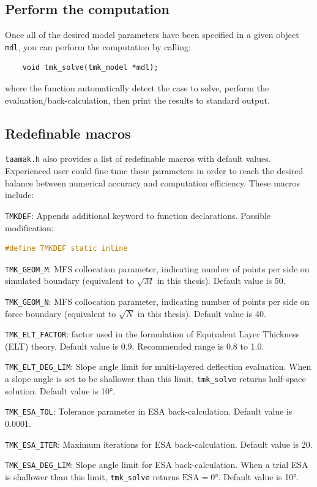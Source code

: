 \documentclass{article}
\begin{document}
\subsection{Perform the computation}
Once all of the desired model parameters have been specified in a given object \texttt{mdl}, you can perform the computation by calling:
\begin{lstlisting}
    void tmk_solve(tmk_model *mdl);
\end{lstlisting}
where the function automatically detect the case to solve, perform the evaluation/back-calculation, then print the results to standard output.

\subsection{Redefinable macros}
\texttt{taamak.h} also provides a list of redefinable macros with default values. Experienced user could fine tune these parameters in order to reach the desired balance between numerical accuracy and computation efficiency. These macros include:
\par 
\medskip
\texttt{TMKDEF}: Appends additional keyword to function declarations. Possible modification: 
\begin{file}[demo.c]
\begin{lstlisting}[language=C]
#define TMKDEF static inline
\end{lstlisting}
\end{file}

\texttt{TMK\_GEOM\_M}: MFS collocation parameter, indicating number of points per side on simulated boundary (equivalent to \( \sqrt{M} \) in this thesis). Default value is 50.
\par 
\medskip
\texttt{TMK\_GEOM\_N}: MFS collocation parameter, indicating number of points per side on force boundary (equivalent to \( \sqrt{N} \) in this thesis). Default value is 40.
\par 
\medskip
\texttt{TMK\_ELT\_FACTOR}: factor used in the formulation of Equivalent Layer Thickness (ELT) theory. Default value is 0.9. Recommended range is 0.8 to 1.0.
\par 
\medskip
\texttt{TMK\_ELT\_DEG\_LIM}: Slope angle limit for multi-layered deflection evaluation. When a slope angle is set to be shallower than this limit, \texttt{tmk\_solve} returns half-space solution. Default value is \ang{10}.
\par 
\medskip
\texttt{TMK\_ESA\_TOL}: Tolerance parameter in ESA back-calculation. Default value is 0.0001.
\par 
\medskip
\texttt{TMK\_ESA\_ITER}: Maximum iterations for ESA back-calculation. Default value is 20.
\par 
\medskip
\texttt{TMK\_ESA\_DEG\_LIM}: Slope angle limit for ESA back-calculation. When a trial ESA is shallower than this limit, \texttt{tmk\_solve} returns \( \mathrm{ESA} = \ang{0} \). Default value is \ang{10}.
\end{document}

